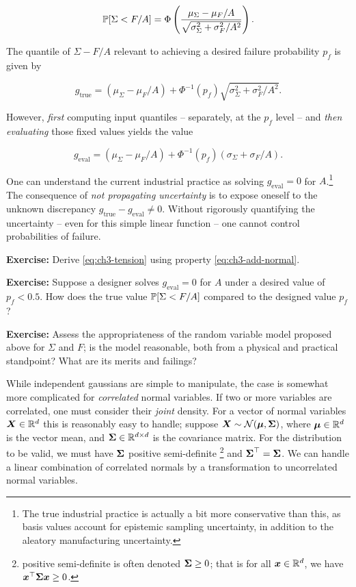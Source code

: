 \documentclass[../primer.tex]{subfiles}
\begin{document}
\begin{equation} \label{eq:ch3-tension}
    \P[ \Sigma < F/A ] = \Phi\left( %
      \frac{\mu_{\Sigma} - \mu_F/A}{\sqrt{\sigma_{\Sigma}^2 + \sigma_F^2/A^2}}
    \right).
\end{equation}

\noindent The quantile of $\Sigma - F/A$ relevant to achieving a desired failure
probability $p_f$ is given by

\begin{equation} \label{eq:ch3-lim-quantile-true}
  g_{\text{true}} = (\mu_{\Sigma} - \mu_F/A) + %
    \Phi^{-1}(p_f)\sqrt{\sigma_{\Sigma}^2 + \sigma_F^2/A^2}.
\end{equation}

However, \emph{first} computing input quantiles -- separately, at the $p_f$
level -- and \emph{then evaluating} those fixed values yields the value

\begin{equation} \label{eq:ch3-lim-quantile-eval}
  g_{\text{eval}} = (\mu_{\Sigma} - \mu_F/A) + %
    \Phi^{-1}(p_f)(\sigma_{\Sigma} + \sigma_F/A).
\end{equation}

One can understand the current industrial practice as solving $g_{\text{eval}} =
0$ for $A$.\footnote{The true industrial practice is actually a bit more
  conservative than this, as basis values account for epistemic sampling
  uncertainty, in addition to the aleatory manufacturing uncertainty.} The
consequence of \emph{not propagating uncertainty} is to expose oneself to the
unknown discrepancy $g_{\text{true}} - g_{\text{eval}} \neq 0$. Without
rigorously quantifying the uncertainty -- even for this simple linear function
-- one cannot control probabilities of failure.

\textbf{Exercise:} Derive \eqref{eq:ch3-tension} using property
\eqref{eq:ch3-add-normal}.

\textbf{Exercise:} Suppose a designer solves $g_{\text{eval}} = 0$ for $A$ under
a desired value of $p_f < 0.5$. How does the true value $\P[ \Sigma < F/A ]$
compared to the designed value $p_f$?

\textbf{Exercise:} Assess the appropriateness of the random variable model
proposed above for $\Sigma$ and $F$; is the model reasonable, both from a
physical and practical standpoint? What are its merits and failings?

While independent gaussians are simple to manipulate, the case is somewhat more
complicated for \emph{correlated} normal variables. If two or more variables are
correlated, one must consider their \emph{joint} density. For a vector of normal
variables $\mX\in\R{d}$ this is reasonably easy to handle; suppose $\mX \sim
\dN(\v\mu, \m\Sigma)$, where $\v\mu\in\R{d}$ is the vector mean, and
$\m\Sigma\in\R{d\times d}$ is the covariance matrix. For the distribution to be
valid, we must have $\m\Sigma$ positive semi-definite \footnote{positive
  semi-definite is often denoted $\m\Sigma\geq0$; that is for all $\vx\in\R{d}$,
  we have $\vx^{\top}\m\Sigma\vx \geq 0$.} and $\m\Sigma^{\top} = \m\Sigma$. We
can handle a linear combination of correlated normals by a transformation to
uncorrelated normal variables.
\end{document}

